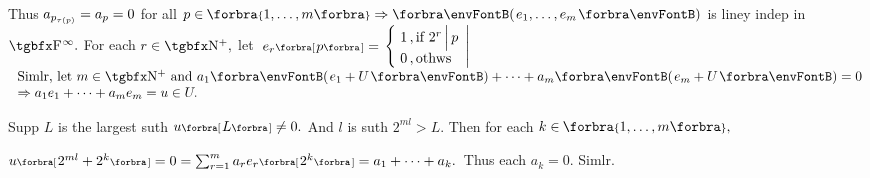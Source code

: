 Thus $a_{p_{\tau(\hspace{0pt}{p}\hspace{0pt})}}=a_p=0$ for all $p\in\;\!\!\Bra{1,\dots,m}\Rightarrow\Par{e_1,\dots,e_m}$ is liney indep in $\FbbP{\infty}.$\PfEnd\vspace{12pt}\quad
\Or For each $r\in\Nbp,$ let $\;e_r\Sbra{p}={}${\FontSmall$\hMath[0pt]{l}{\left\{\hspace{-2pt}}{\right|}{1\,,\text{if }2^r\,\Big|\,p\\0\,,\text{othws}}$}$\hText{$
	Simlr, let $m\in\Nbp$ and $a_1\Par{e_1+U}+\dots+a_m\Par{e_m+U}=0\\$
	$\Rightarrow a_1e_1+\dots+a_me_m=u\in U.$
	$}$\vspace{3pt}\par\quad
Supp $L$ is the largest suth $u\Sbra{L}\neq 0.$ And $l$ is suth $2^{ml}> L.$ \;Then for each $k\in\;\!\!\Bra{1,\dots,m},$\vspace{2pt}\par\quad
$u\Sbra{2^{ml}+2^k}=0=\sum_{r=1}^m a_re_r\Sbra{2^k}=a_1+\dots+a_k.$ \,Thus each $a_k=0.$ Simlr.\PfEnd
\SepLine
\ChEnd
\pagebreak


\vspace{4pt}

